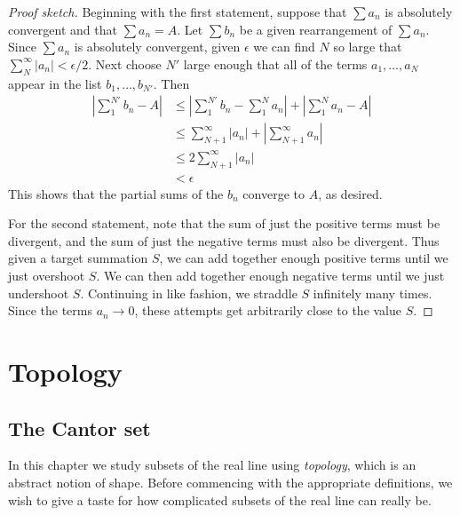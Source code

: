 \documentclass[11pt,oneside]{amsbook}
\theoremstyle{definition}
\theoremstyle{plain}
\theoremstyle{definition}
\theoremstyle{remark}
\numberwithin{equation}{section}
\numberwithin{figure}{section}
\begin{document}
\begin{proof}[Proof sketch]
  Beginning with the first statement, suppose that $\sum a_n$ is absolutely convergent and that $\sum a_n=A$. Let $\sum b_n$ be a given rearrangement of $\sum a_n$. Since $\sum a_n$ is absolutely convergent, given $\epsilon$ we can find $N$ so large that $\sum_N^\infty|a_n|<\epsilon/2$. Next choose $N'$ large enough that all of the terms $a_1,\ldots,a_N$ appear in the list $b_1,\ldots,b_{N'}$. Then
  \begin{align*}
    |\sum_1^{N'}b_n-A|&\leq\left|\sum_1^{N'}b_n-\sum_1^Na_n\right|
                        +\left|\sum_1^Na_n-A\right|\\
                      &\leq\sum_{N+1}^\infty|a_n|
                        +\left|\sum_{N+1}^\infty a_n\right|\\
                      &\leq2\sum_{N+1}^\infty|a_n|\\
                      &<\epsilon
  \end{align*}
  This shows that the partial sums of the $b_n$ converge to $A$, as desired.
  
  For the second statement, note that the sum of just the positive terms must be divergent, and the sum of just the negative terms must also be divergent. Thus given a target summation $S$, we can add together enough positive terms until we just overshoot $S$. We can then add together enough negative terms until we just undershoot $S$. Continuing in like fashion, we straddle $S$ infinitely many times. Since the terms $a_n\to0$, these attempts get arbitrarily close to the value $S$.
\end{proof}


\chapter{Topology}

\section{The Cantor set}

In this chapter we study subsets of the real line using \emph{topology}, which is an abstract notion of shape. Before commencing with the appropriate definitions, we wish to give a taste for how complicated subsets of the real line can really be.
\end{document}
